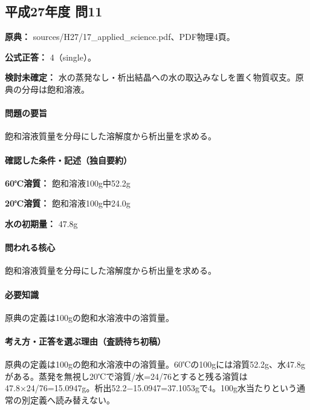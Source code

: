 \subsection{平成27年度 問11}
\label{q:h27-reg-applied-11}

\noindent\textbf{原典：} sources/H27/17\_applied\_science.pdf、PDF物理4頁。

\textbf{公式正答：} 4（single）。

\par\textbf{検討未確定：} 水の蒸発なし・析出結晶への水の取込みなしを置く物質収支。原典の分母は飽和溶液。

\paragraph{問題の要旨} 飽和溶液質量を分母にした溶解度から析出量を求める。

\paragraph{確認した条件・記述（独自要約）}\mbox{}\par

\noindent\textbf{60℃溶質：} 飽和溶液100g中52.2g\par

\noindent\textbf{20℃溶質：} 飽和溶液100g中24.0g\par

\noindent\textbf{水の初期量：} 47.8g\par

\paragraph{問われる核心} 飽和溶液質量を分母にした溶解度から析出量を求める。

\paragraph{必要知識} 原典の定義は100gの飽和水溶液中の溶質量。

\paragraph{考え方・正答を選ぶ理由（査読待ち初稿）} 原典の定義は100gの飽和水溶液中の溶質量。60℃の100gには溶質52.2g、水47.8gがある。蒸発を無視し20℃で溶質/水=24/76とすると残る溶質は47.8×24/76=\allowbreak{}15.0947g。析出52.2−15.0947=\allowbreak{}37.1053gで4。100g水当たりという通常の別定義へ読み替えない。

